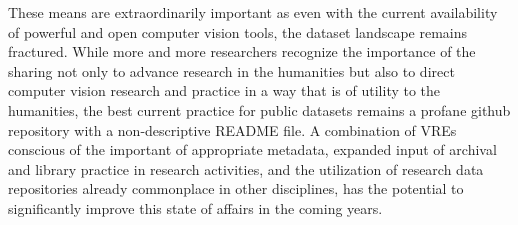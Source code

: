 These means are extraordinarily important as even with the current availability
of powerful and open computer vision tools, the dataset landscape remains
fractured. While more and more researchers recognize the importance of the
sharing not only to advance research in the humanities but also to direct
computer vision research and practice in a way that is of utility to the
humanities, the best current practice for public datasets remains a profane
github repository with a non-descriptive README file. A combination of VREs
conscious of the important of appropriate metadata, expanded input of archival
and library practice in research activities, and the utilization of research
data repositories already commonplace in other disciplines, has the potential
to significantly improve this state of affairs in the coming years.

\printbibliography[heading=subbibliography]
\endrefsection
